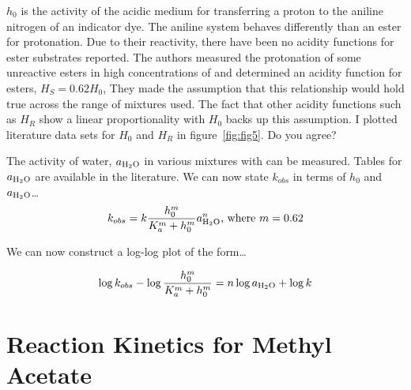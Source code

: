 \documentclass[]{tufte-handout}
\begin{document}
$h_0$ is the activity of the acidic medium for transferring a proton to the aniline nitrogen of an indicator dye. The aniline system behaves differently than an ester for protonation. Due to their reactivity, there have been no acidity functions for ester substrates reported. The authors measured the protonation of some unreactive esters in high concentrations of  and determined an acidity function for esters, $H_S = 0.62 H_0$, They made the assumption that this relationship would hold true across the range of  mixtures used. The fact that other acidity functions such as $H_R$ show a linear proportionality with $H_0$ backs up this assumption. I plotted literature data sets for $H_0$ and $H_R$ in figure~\ref{fig:fig5}. Do you agree?

The activity of water, $a_{\ce{H2O}}$ in various mixtures with  can be measured. Tables for $a_{\ce{H2O}}$ are available in the literature.
We can now state $k_{obs}$ in terms of $h_0$ and $a_{\ce{H2O}}$\ldots
\begin{equation}
   k_{obs} =  k\frac{h_0^m}{K_a^m + h_0^m}a_{\ce{H2O}}^n \textrm{,  where }m = 0.62
  \label{eq:4}
\end{equation}

We can now construct a log-log plot of the form\ldots{}

\begin{equation}
   \log{k_{obs}}-\log{\frac{h_0^m}{K_a^m + h_0^m}} =  n\log{a_{\ce{H2O}} + \log{k}} 
  \label{eq:5}
\end{equation}

\section{Reaction Kinetics for Methyl Acetate}
\end{document}
